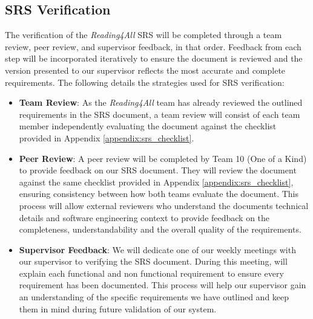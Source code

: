 \documentclass[12pt, titlepage]{article}
\begin{document}
  
\subsection{SRS Verification}
The verification of the \textit{Reading4All} SRS will be completed
through a team review, peer review, and supervisor feedback, in that order.
Feedback from each step will be incorporated iteratively to ensure
the document is reviewed and the version presented to our supervisor
reflects the most accurate and complete requirements. The following details the 
strategies used for SRS verification: 

\begin{itemize}
  \item \textbf{Team Review}:
  As the \textit{Reading4All} team has already reviewed the outlined
  requirements in the SRS document, a team review will
  consist of each team member independently evaluating the document
  against the checklist provided in Appendix \ref{appendix:srs_checklist}.  
  
  \item \textbf{Peer Review}:
  A peer review will be completed by Team 10 (One of a Kind) to provide
  feedback on our SRS document.
  They will review the document against the same checklist provided in
  Appendix \ref{appendix:srs_checklist}, ensuring consistency between
  how both teams evaluate the document.
  This process will allow external reviewers who understand the
  documents technical details and software engineering context to
  provide feedback on the completeness, understandability and the
  overall quality of the requirements. 
  
  \item \textbf{Supervisor Feedback}:
  We will dedicate one of our weekly meetings with our supervisor to
  verifying the SRS document.
  During this meeting, will explain each functional and non functional
  requirement to ensure every requirement has been documented.
  This process will help our supervisor gain an understanding of the
  specific requirements we have outlined and keep them in
  mind during future validation of our system. 
\end{itemize}
\end{document}
